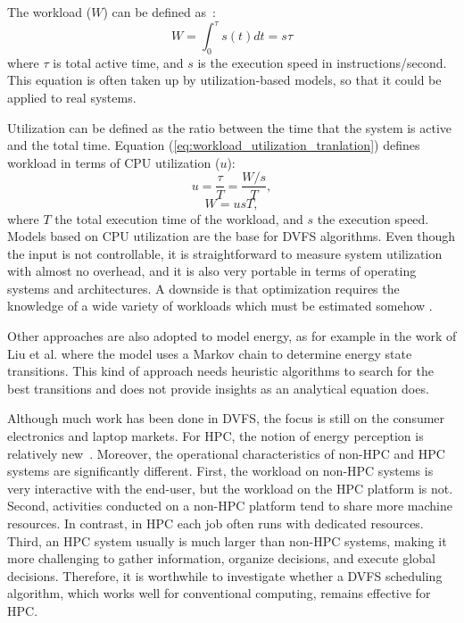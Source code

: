 \documentclass{ieeeaccess}
\begin{document}
The workload ($W$) can be defined as~\cite{Paolillo2018OptimisationParallelism, Group2012HandbookSahni, Kim2015RacingHeuristics}:
\begin{equation}
    W = \int_{0}^{\tau}s(t)dt = s\tau
    \label{eq:workload_definition}
\end{equation}
where $\tau$ is total active time, and $s$ is the execution speed in instructions/second.
This equation is often taken up by utilization-based models, so that it could be applied to real systems. 

Utilization can be defined as the ratio between the time that the system is active and the total time. Equation (\ref{eq:workload_utilization_tranlation}) defines workload in terms of CPU utilization ($u$):
\begin{equation}
    u = \frac{\tau}{T} = \frac{W/s}{T},
    \label{eq:utilization_definition}
\end{equation}
\begin{equation}
    W = usT,
    \label{eq:workload_utilization_tranlation}
\end{equation}
where $T$ the total execution time of the workload, and $s$ the execution speed.
Models based on CPU utilization are the base for DVFS algorithms. Even though the input is not controllable, it is straightforward  to measure system utilization with almost no overhead, and it is also very portable in terms of operating systems and architectures. 
A downside is that optimization requires the knowledge of a wide variety of workloads which must be estimated somehow \cite{Fu2018RaceMinimization, Group2012HandbookSahni}.


Other approaches are also adopted to model energy, as for example in the work of Liu et al. \cite{Liu2016IntelligentSupplies} where the model uses a Markov chain to determine energy state transitions. This kind of approach needs heuristic algorithms to search for the best transitions and does not provide insights as an analytical equation does.

Although much work has been done in DVFS, the focus is still on the consumer electronics and laptop markets. 
For HPC, the notion of energy perception is relatively new~\cite{Beckman2005MakingSupercomputing}. 
Moreover, the operational characteristics of non-HPC and HPC systems are significantly different. 
First, the workload on non-HPC systems is very interactive with the end-user, but the workload on the HPC platform is not. 
Second, activities conducted on a non-HPC platform tend to share more machine resources.
In contrast, in HPC each job often runs with dedicated resources. 
Third, an HPC system usually is much larger than non-HPC systems, making it more  challenging to gather information, organize decisions, and execute global decisions.
Therefore, it is worthwhile to investigate whether a DVFS scheduling algorithm, which works well for conventional computing, remains effective for HPC.
\end{document}
